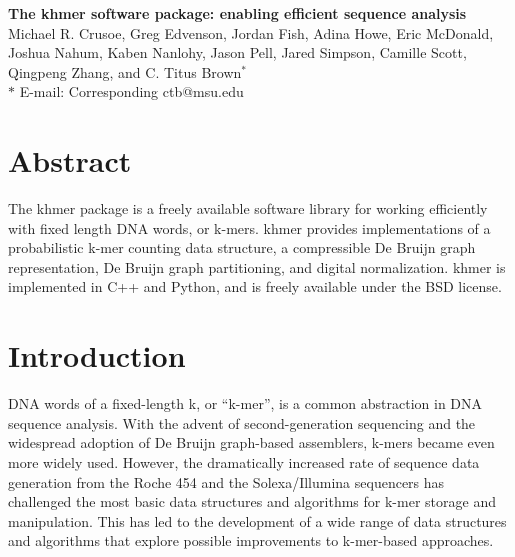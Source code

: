 \documentclass[10pt]{article}
\date{}
\begin{document}
\begin{flushleft}
{\Large
\textbf{The khmer software package: enabling efficient sequence analysis}
}
\\

Michael R. Crusoe, Greg Edvenson, Jordan Fish, Adina Howe, Eric McDonald, Joshua Nahum, Kaben Nanlohy, Jason Pell, Jared Simpson, Camille Scott, Qingpeng Zhang, and C. Titus Brown$^{\ast}$
\\
$\ast$ E-mail: Corresponding ctb@msu.edu
\end{flushleft}

\section*{Abstract}

The khmer package is a freely available software library for working
efficiently with fixed length DNA words, or k-mers.  khmer provides
implementations of a probabilistic k-mer counting data structure,
a compressible De Bruijn graph representation, De Bruijn graph
partitioning, and digital normalization.  khmer is implemented in C++
and Python, and is freely available under the BSD license.


\section*{Introduction}

DNA words of a fixed-length k, or ``k-mer'', is a common abstraction
in DNA sequence analysis.  With the advent of second-generation
sequencing and the widespread adoption of De Bruijn graph-based
assemblers, k-mers became even more widely used.  However, the
dramatically increased rate of sequence data generation from the Roche
454 and the Solexa/Illumina sequencers has challenged the most basic
data structures and algorithms for k-mer storage and manipulation.
This has led to the development of a wide range of data structures and
algorithms that explore possible improvements to k-mer-based
approaches.
\end{document}

